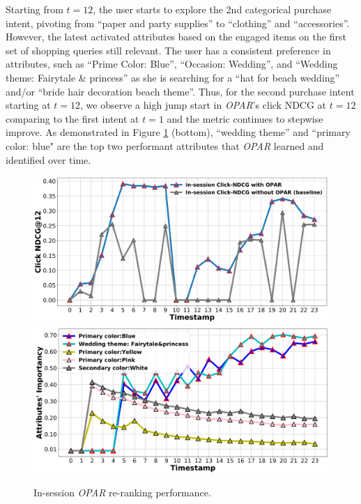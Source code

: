 \documentclass[11pt, dvipdfmx]{article}
\begin{document}
Starting from $t=12$, the user starts to explore the 2nd categorical purchase intent, pivoting from ``paper and party supplies'' to ``clothing'' and ``accessories''. However, the latest activated attributes based on the engaged items on the first set of shopping queries still relevant. The user has a consistent preference in attributes, such as ``Prime Color: Blue'', ``Occasion: Wedding'', and ``Wedding theme: Fairytale $\&$ princess'' as she is searching for a ``hat for beach wedding'' and/or ``bride hair decoration beach theme''. Thus, for the second purchase intent starting at $t=12$, we observe a high jump start in \textit{OPAR}'s click NDCG at $t=12$ comparing to the first intent at $t=1$ and the metric continues to stepwise improve. As demonstrated in Figure \ref{fig:multiIntent} (bottom), ``wedding theme'' and ``primary color: blue" are the top two performant attributes that \emph{OPAR} learned and identified over time. 

\begin{figure}[!t]
    \centering
    \includegraphics[bb=-200 0 0 60]{submissions/in_session_ranking/figs/Figure4_inSessionNDCG_png}
    \includegraphics[bb=0 0 200 60]{submissions/in_session_ranking/figs/Figure5_interpretableAttribute_png}
    \caption{In-session \textit{OPAR} re-ranking performance.}
    \label{fig:multiIntent}
\end{figure}
\end{document}
